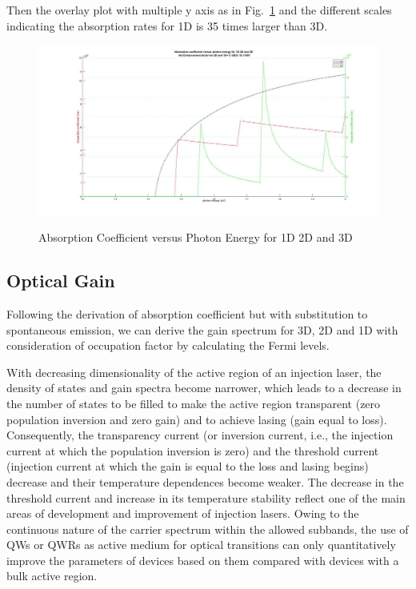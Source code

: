 Then the overlay plot with multiple y axis as in Fig.~\ref{absrate_overlay} and
the different scales indicating the absorption rates for 1D is 35
times larger than 3D.

\begin{figure}
  \caption{Absorption Coefficient versus Photon Energy for 1D 2D and 3D}
  \centering
  \includegraphics[width=\textwidth]{pictures/LT/absrate_overlay}
  \label{absrate_overlay}
\end{figure}

\subsection{Optical Gain}

Following the derivation of absorption coefficient but with substitution to
spontaneous emission, we can derive the gain spectrum for 3D, 2D and 1D with
consideration of occupation factor by calculating the Fermi levels.

With decreasing dimensionality of the active region of an injection laser, the
density of states and gain spectra become narrower, which leads to a decrease
in the number of states to be filled to make the active region transparent
(zero population inversion and zero gain) and to achieve lasing (gain equal to
loss). Consequently, the transparency current (or inversion current, i.e., the
injection current at which the population inversion is zero) and the threshold
current (injection current at which the gain is equal to the loss and lasing
begins) decrease and their temperature dependences become weaker. The decrease
in the threshold current and increase in its temperature stability reflect one
of the main areas of development and improvement of injection lasers. Owing to
the continuous nature of the carrier spectrum within the allowed subbands, the
use of QWs or QWRs as active medium for optical transitions can only
quantitatively improve the parameters of devices based on them compared with
devices with a bulk active region.

